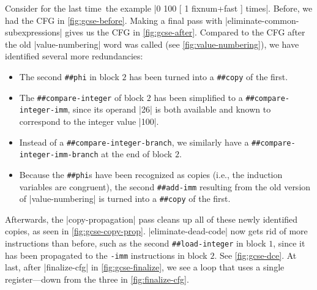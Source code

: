 
Consider for the last time~the example
%
\factor|0 100 [ 1 fixnum+fast ] times|.
%
Before, we had the \gls{CFG} in \vref{fig:gcse-before}.  Making a final pass
with \factor|eliminate-common-subexpressions| gives us the \gls{CFG} in
\vref{fig:gcse-after}.  Compared to the \gls{CFG} after the old
\factor|value-numbering| word was called (see \vref{fig:value-numbering}), we
have identified several more redundancies:
\begin{itemize}
  \item The second \Verb|##phi| in block $2$ has been turned into a
  \Verb|##copy| of the first.
%
  \item The \Verb|##compare-integer| of block $2$ has been simplified to
  a \Verb|##compare-integer-imm|, since its operand \factor|26| is both
  available and known to correspond to the integer value \factor|100|.
%
  \item Instead of a \Verb|##compare-integer-branch|, we similarly have a
  \Verb|##compare-integer-imm-branch| at the end of block $2$.
%
  \item Because the \Verb|##phi|s have been recognized as copies (i.e., the
  induction variables are congruent), the second \Verb|##add-imm| resulting
  from the old version of \factor|value-numbering| is turned into a
  \Verb|##copy| of the first.
\end{itemize}


Afterwards, the \factor|copy-propagation| pass cleans up all of these newly
identified copies, as seen in \vref{fig:gcse-copy-prop}.
\factor|eliminate-dead-code| now gets rid of more instructions than before,
such as the second \Verb|##load-integer| in block $1$, since it has been
propagated to the \Verb|-imm| instructions in block $2$.  See
\vref{fig:gcse-dce}.  At last, after \factor|finalize-cfg| in
\vref{fig:gcse-finalize}, we see a loop that uses a single register---down from
the three in \vref{fig:finalize-cfg}.
